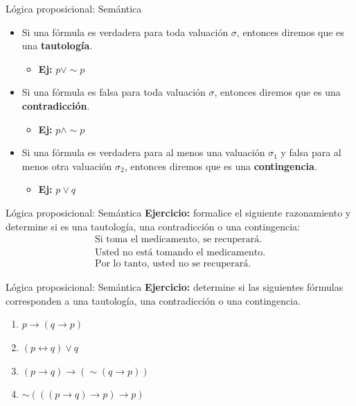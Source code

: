 \documentclass{beamer}
\begin{document}
\begin{frame}{Lógica proposicional: Semántica}
  \begin{itemize}[<+->]
    \item Si una fórmula es verdadera para toda valuación $\sigma$, entonces
          diremos que es una \textbf{tautología}.
          \begin{itemize}
            \item \textbf{Ej:} $p \vee \sim p$
          \end{itemize}

    \item Si una fórmula es falsa para toda valuación $\sigma$, entonces diremos
          que es una \textbf{contradicción}.
          \begin{itemize}
            \item \textbf{Ej:} $p \land \sim p$
          \end{itemize}

    \item Si una fórmula es verdadera para al menos una valuación $\sigma_{1}$ y
          falsa para al menos otra valuación $\sigma_{2}$, entonces diremos que
          es una \textbf{contingencia}.
          \begin{itemize}
            \item \textbf{Ej:} $p \vee q$
          \end{itemize}
  \end{itemize}
\end{frame}


\begin{frame}{Lógica proposicional: Semántica}
  \textbf{Ejercicio:} formalice el siguiente razonamiento y determine si es una tautología, una contradicción o una contingencia:
  \[
    \begin{array}{c}
      \text{Si toma el medicamento, se recuperará.} \\
      \text{Usted no está tomando el medicamento.} \\
      \hline
      \text{Por lo tanto, usted no se recuperará.}
    \end{array}
  \]
\end{frame}


\begin{frame}{Lógica proposicional: Semántica}
  \textbf{Ejercicio:} determine si las siguientes fórmulas corresponden a una
  tautología, una contradicción o una contingencia.

  \begin{enumerate}
    \item $p \rightarrow (q \rightarrow p)$
    \item $(p \leftrightarrow q) \vee q$
    \item $(p \rightarrow q) \rightarrow (\sim(q \rightarrow p))$
    \item $\sim(((p \rightarrow q) \rightarrow p) \rightarrow p)$
  \end{enumerate}
\end{frame}
\end{document}
